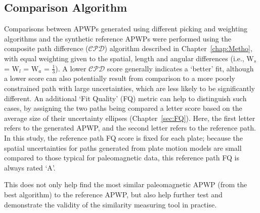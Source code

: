 \subsection{Comparison Algorithm}

Comparisons between APWPs generated using different picking and weighting
algorithms and the synthetic reference APWPs were performed using the composite
path difference ($\mathcal{CPD}$) algorithm described in
Chapter~\ref{chap:Metho}, with equal weighting given to the spatial, length and
angular differences (i.e., W$_s$ = W$_l$ = W$_a$ = $\frac{1}{3}$). A lower
$\mathcal{CPD}$ score generally indicates a `better' fit, although a lower score
can also potentially result from comparison to a more poorly constrained path
with large uncertainties, which are less likely to be significantly different.
An additional `Fit Quality' (FQ) metric can help to distinguish such cases, by
assigning the two paths being compared a letter score based on the average size
of their uncertainty ellipses (Chapter~\ref{sec:FQ}). Here, the first letter
refers to the generated APWP, and the second letter refers to the reference
path. In this study, the reference path FQ score is fixed for each plate;
because the spatial uncertainties for paths generated from plate motion models
are small compared to those typical for paleomagnetic data, this reference path
FQ is always rated `A'.

This does not only help find the most similar paleomagnetic APWP (from the best
algorithm) to the reference APWP, but also help further test and demonstrate the
validity of the similarity measuring tool in practise.

